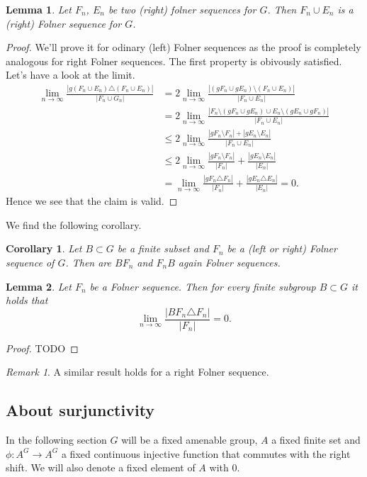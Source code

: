 \documentclass[titlepage, a4paper]{article}
\newcommand{\card}[1]{\left| #1 \right|}
\newtheorem{lemma}{Lemma}
\newtheorem{corollary}{Corollary}
\theoremstyle{remark}
\newtheorem{remark}{Remark}
\begin{document}
\begin{lemma}
	Let $F_n$, $E_n$ be two (right) folner sequences for $G$. Then $F_n \cup E_n$ is a (right) Folner sequence for $G$.
\end{lemma}
\begin{proof}
	We'll prove it for odinary (left) Folner sequences as the proof is completely analogous for right Folner sequences.
	The first property is obivously satisfied. 
	Let's have a look at the limit.
	\begin{align*}
		\lim_{n \to \infty} \frac{\card{g(F_n \cup E_n) \triangle (F_n \cup E_n)}}{\card{F_n \cup G_n}} &= 2 \lim_{n \to \infty} \frac{\card{(gF_n \cup gE_n)\setminus (F_n \cup E_n)}}{\card{F_n \cup E_n}} \\
														&= 2 \lim_{n \to \infty} \frac{\card{F_n \setminus (gF_n \cup g E_n) \cup E_n\setminus (gE_n \cup gF_n) }}{\card{F_n \cup E_n}} \\
														&\le 2 \lim_{n \to \infty} \frac{\card{gF_n \setminus F_n} + \card{gE_n \setminus E_n}}{\card{F_n \cup E_n}}\\
														&\le 2 \lim_{n \to \infty}  \frac{\card{gF_n \setminus F_n}}{\card{F_n}} + \frac{\card{gE_n \setminus E_n}}{\card{E_n}} \\
														&=  \lim_{n \to \infty} \frac{\card{gF_n \triangle F_n}}{\card{F_n}} +  \frac{\card{gE_n \triangle E_n}}{\card{E_n}}= 0  
	.\end{align*}
	Hence we see that the claim is valid.
\end{proof}
We find the following corollary. 
\begin{corollary}\label{cor:product_folner_sequence}
	Let $B \subset G$ be a finite subset and $F_n$ be a (left or right) Folner sequence of $G$. Then are $BF_n$ and $F_nB$ again Folner sequences.
\end{corollary}

\begin{lemma}\label{lem:folner_finite_subset}
	Let $F_n$ be a Folner sequence. Then for every finite subgroup $B \subset G$ it holds that  \[
	\lim_{n \to \infty} \frac{\card{BF_n \triangle F_n}}{\card{F_n}} = 0	
	.\] 
\end{lemma}
\begin{proof}
	TODO
\end{proof}
\begin{remark}
	A similar result holds for a right Folner sequence.
\end{remark}
\subsection{About surjunctivity}
In the following section $G$ will be a fixed amenable group, $A$ a fixed finite set and $\phi: A^{G} \to A^{G}$ a fixed continuous injective function that commutes with the right shift. 
We will also denote a fixed element of $A$ with $0$.
\end{document}
